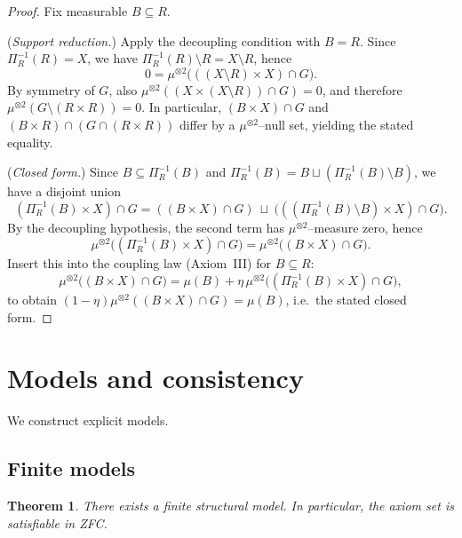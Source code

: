 \documentclass[11pt]{article}
\numberwithin{equation}{section}
\newtheorem{theorem}{Theorem}[section]
\theoremstyle{definition}
\begin{document}
\begin{proof}
Fix measurable $B\subseteq R$.

(\emph{Support reduction.})
Apply the decoupling condition with $B=R$. Since $\Pi_R^{-1}(R)=X$, we have $\Pi_R^{-1}(R)\setminus R=X\setminus R$, hence
\[
0=\mu^{\otimes2}\big(((X\setminus R)\times X)\cap G\big).
\]
By symmetry of $G$, also $\mu^{\otimes2}((X\times(X\setminus R))\cap G)=0$, and therefore
$\mu^{\otimes2}(G\setminus(R\times R))=0$.
In particular, $(B\times X)\cap G$ and $(B\times R)\cap(G\cap(R\times R))$ differ by a $\mu^{\otimes2}$--null set, yielding the stated equality.

(\emph{Closed form.})
Since $B\subseteq \Pi_R^{-1}(B)$ and $\Pi_R^{-1}(B)=B\sqcup(\Pi_R^{-1}(B)\setminus B)$, we have a disjoint union
\[
(\Pi_R^{-1}(B)\times X)\cap G
=
((B\times X)\cap G)\ \sqcup\ \big(((\Pi_R^{-1}(B)\setminus B)\times X)\cap G\big).
\]
By the decoupling hypothesis, the second term has $\mu^{\otimes2}$--measure zero, hence
\[
\mu^{\otimes2}\big((\Pi_R^{-1}(B)\times X)\cap G\big)=\mu^{\otimes2}\big((B\times X)\cap G\big).
\]
Insert this into the coupling law (Axiom~III) for $B\subseteq R$:
\[
\mu^{\otimes2}\big((B\times X)\cap G\big)=\mu(B)+\eta\,\mu^{\otimes2}\big((\Pi_R^{-1}(B)\times X)\cap G\big),
\]
to obtain $(1-\eta)\mu^{\otimes2}((B\times X)\cap G)=\mu(B)$, i.e.\ the stated closed form.
\end{proof}


\section{Models and consistency}\label{sec:models}

We construct explicit models.

\subsection{Finite models}

\begin{theorem}\label{thm:finite-model}
There exists a finite structural model. In particular, the axiom set is satisfiable in ZFC.
\end{theorem}


  
  
\end{document}
